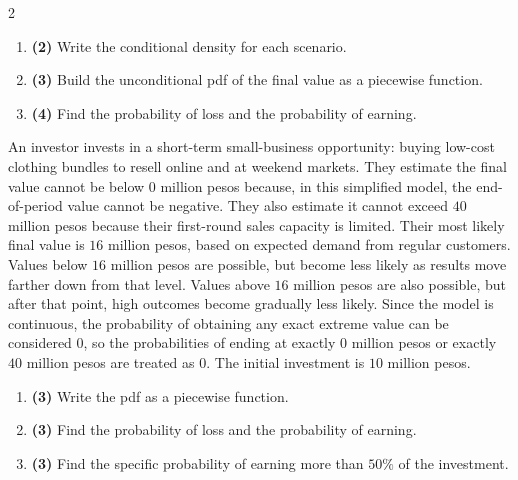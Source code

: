 \begin{multicols}{2}
		
		\begin{enumerate}[label=\textbf{\alph*)}]
			\item \textbf{(2)} Write the conditional density for each scenario.
			\item \textbf{(3)} Build the unconditional pdf of the final value as a piecewise function.
			\item \textbf{(4)} Find the probability of loss and the probability of earning.
		\end{enumerate}
		
		\vspace{0.25cm}
		\vspace{-0.3cm}
		An investor invests in a short-term small-business opportunity: buying low-cost clothing bundles to resell online and at weekend markets. They estimate the final value cannot be below $0$ million pesos because, in this simplified model, the end-of-period value cannot be negative. They also estimate it cannot exceed $40$ million pesos because their first-round sales capacity is limited. Their most likely final value is $16$ million pesos, based on expected demand from regular customers. Values below $16$ million pesos are possible, but become less likely as results move farther down from that level. Values above $16$ million pesos are also possible, but after that point, high outcomes become gradually less likely. Since the model is continuous, the probability of obtaining any exact extreme value can be considered $0$, so the probabilities of ending at exactly $0$ million pesos or exactly $40$ million pesos are treated as $0$. The initial investment is $10$ million pesos.
		

		\begin{enumerate}[label=\textbf{\alph*)}]
			\item \textbf{(3)} Write the pdf as a piecewise function.
			\item \textbf{(3)} Find the probability of loss and the probability of earning.
			\item \textbf{(3)} Find the specific probability of earning more than \(50\%\) of the investment.
		\end{enumerate}
		
		\vspace{-0.3cm}

		


\end{multicols}
